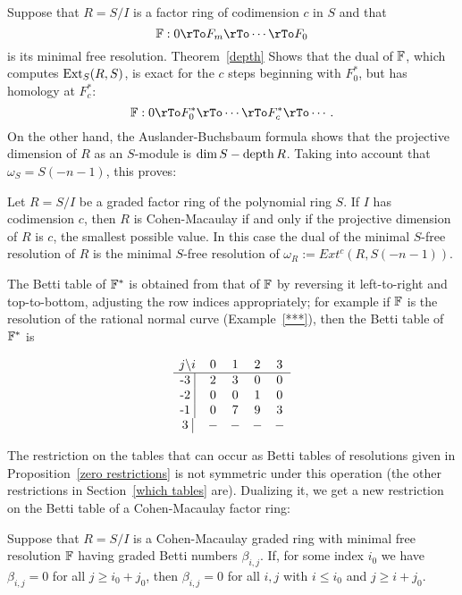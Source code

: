Suppose that $R = S/I$ is a  factor ring of codimension $c$ in $S$ and that
$$
\FF: 0 \rTo F_{m} \rTo\cdots\rTo F_{0}
$$ 
is its minimal free resolution. Theorem~\ref{depth} %
Shows that the dual of ${\mathbb F}$, which computes ${\rm{Ext}}_{S}(R,S)$, is exact for the $c$ steps beginning
with $F_{0}^{*}$, but has homology at $F_{c}^{*}$:
$$
\FF: 0 \rTo F_{0}^{*} \rTo\cdots\rTo F_{c}^{*} \rTo\cdots.
$$ 
On the other hand, the Auslander-Buchsbaum formula shows that the projective dimension of $R$
as an $S$-module is $\dim S - \operatorname{depth} R$. Taking into account that $\omega_{S} = S(-n-1)$, this proves:
\begin{proposition}
 Let $R = S/I$ be a graded factor ring of the polynomial ring $S$. If $I$ has codimension $c$, then
 $R$ is Cohen-Macaulay if and only if the projective dimension of $R$ is $c$, the smallest possible value.
 In this case the dual of the minimal $S$-free resolution of $R$ is the minimal $S$-free resolution of
 $\omega_{R} := Ext^{c}(R,S(-n-1))$.
\end{proposition}

The Betti table of ${\mathbb F}^{*}$ is obtained from that of ${\mathbb F}$ by reversing it left-to-right and top-to-bottom, adjusting the row indices appropriately; for example if ${\mathbb F}$ is the resolution of the rational normal curve
(Example~\ref{***}), then the Betti table of ${\mathbb F}^{*}$ is 
\begin{small}
$$
\begin{matrix}
j \backslash i &0&1&2&3\\ \hline
\text{-3 }\vline &2&3&0&0\\
\text{-2 }\vline &0&0&1&0\\
\text{-1 }\vline &0&7&9&3\\
\text{3 }\vline &-&-&-&-\\
\end{matrix}
$$
\end{small}

The restriction on the tables that can occur as Betti tables of resolutions given in Proposition~\ref{zero restrictions} is not symmetric under this operation (the other restrictions in Section~\ref{which tables} are). Dualizing it, we get a new restriction on the Betti table of a Cohen-Macaulay factor ring:

\begin{corollary}\label{dual zero restrictions}
 Suppose that $R = S/I$ is a Cohen-Macaulay graded ring with minimal free resolution ${\mathbb F}$ having
 graded Betti numbers
 $\beta_{i,j}$. If, for some index $i_{0}$ we have $\beta_{i,j} = 0$ for all $j\geq i_{0}+j_{0}$, then
 $\beta_{i,j} = 0$ for all $i,j$ with $i\leq i_{0}$ and $j\geq i+j_{0}$. 
 \end{corollary}

